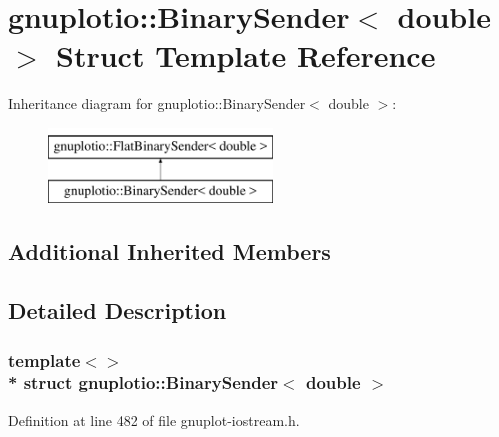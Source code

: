 \hypertarget{structgnuplotio_1_1_binary_sender_3_01double_01_4}{}\section{gnuplotio\+:\+:Binary\+Sender$<$ double $>$ Struct Template Reference}
\label{structgnuplotio_1_1_binary_sender_3_01double_01_4}
Inheritance diagram for gnuplotio\+:\+:Binary\+Sender$<$ double $>$\+:\begin{figure}[H]
\begin{center}
\leavevmode
\includegraphics[height=2.000000cm]{structgnuplotio_1_1_binary_sender_3_01double_01_4}
\end{center}
\end{figure}
\subsection*{Additional Inherited Members}


\subsection{Detailed Description}
\subsubsection*{template$<$$>$\\*
struct gnuplotio\+::\+Binary\+Sender$<$ double $>$}



Definition at line 482 of file gnuplot-\/iostream.\+h.

